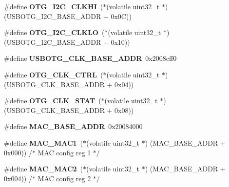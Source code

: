 \begin{DoxyCompactItemize}
\#define {\bfseries O\+T\+G\+\_\+\+I2\+C\+\_\+\+C\+L\+K\+HI}~($\ast$(volatile uint32\+\_\+t $\ast$) (U\+S\+B\+O\+T\+G\+\_\+\+I2\+C\+\_\+\+B\+A\+S\+E\+\_\+\+A\+D\+DR + 0x0\+C))
\item 
\mbox{\label{group__lpc24xx__regs_ga9ae9e9d0aedc4bef5564a61b476c2be9}} 
\#define {\bfseries O\+T\+G\+\_\+\+I2\+C\+\_\+\+C\+L\+K\+LO}~($\ast$(volatile uint32\+\_\+t $\ast$) (U\+S\+B\+O\+T\+G\+\_\+\+I2\+C\+\_\+\+B\+A\+S\+E\+\_\+\+A\+D\+DR + 0x10))
\item 
\mbox{\label{group__lpc24xx__regs_ga33a08ea9b04679bbcc1d2b77c07d8989}} 
\#define {\bfseries U\+S\+B\+O\+T\+G\+\_\+\+C\+L\+K\+\_\+\+B\+A\+S\+E\+\_\+\+A\+D\+DR}~0x2008cff0
\item 
\mbox{\label{group__lpc24xx__regs_ga61ca077f166a9fa01c8b799298f821a6}} 
\#define {\bfseries O\+T\+G\+\_\+\+C\+L\+K\+\_\+\+C\+T\+RL}~($\ast$(volatile uint32\+\_\+t $\ast$) (U\+S\+B\+O\+T\+G\+\_\+\+C\+L\+K\+\_\+\+B\+A\+S\+E\+\_\+\+A\+D\+DR + 0x04))
\item 
\mbox{\label{group__lpc24xx__regs_gaa3a9cf9a453efd9a84c048186dd7bcb3}} 
\#define {\bfseries O\+T\+G\+\_\+\+C\+L\+K\+\_\+\+S\+T\+AT}~($\ast$(volatile uint32\+\_\+t $\ast$) (U\+S\+B\+O\+T\+G\+\_\+\+C\+L\+K\+\_\+\+B\+A\+S\+E\+\_\+\+A\+D\+DR + 0x08))
\item 
\mbox{\label{group__lpc24xx__regs_ga0031d640eb298dd1c9264ad1dd78e37b}} 
\#define {\bfseries M\+A\+C\+\_\+\+B\+A\+S\+E\+\_\+\+A\+D\+DR}~0x20084000
\item 
\mbox{\label{group__lpc24xx__regs_gac134948eb1f75ed5754dff8f087b7a22}} 
\#define {\bfseries M\+A\+C\+\_\+\+M\+A\+C1}~($\ast$(volatile uint32\+\_\+t $\ast$) (M\+A\+C\+\_\+\+B\+A\+S\+E\+\_\+\+A\+D\+DR + 0x000)) /$\ast$ M\+A\+C config reg 1 $\ast$/
\item 
\mbox{\label{group__lpc24xx__regs_ga0ee126b81edcb6a7a9b028c3f53e5cd8}} 
\#define {\bfseries M\+A\+C\+\_\+\+M\+A\+C2}~($\ast$(volatile uint32\+\_\+t $\ast$) (M\+A\+C\+\_\+\+B\+A\+S\+E\+\_\+\+A\+D\+DR + 0x004)) /$\ast$ M\+A\+C config reg 2 $\ast$/
\item 
\mbox{\label{group__lpc24xx__regs_gacc26685c317f27cdee5d359a9b2918f6}} 

\end{DoxyCompactItemize}
